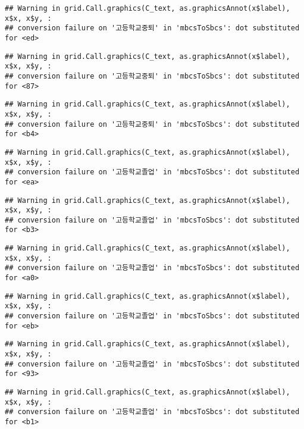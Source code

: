 \documentclass[
]{article}
\begin{document}
\begin{verbatim}
## Warning in grid.Call.graphics(C_text, as.graphicsAnnot(x$label), x$x, x$y, :
## conversion failure on '고등학교중퇴' in 'mbcsToSbcs': dot substituted for <ed>
\end{verbatim}

\begin{verbatim}
## Warning in grid.Call.graphics(C_text, as.graphicsAnnot(x$label), x$x, x$y, :
## conversion failure on '고등학교중퇴' in 'mbcsToSbcs': dot substituted for <87>
\end{verbatim}

\begin{verbatim}
## Warning in grid.Call.graphics(C_text, as.graphicsAnnot(x$label), x$x, x$y, :
## conversion failure on '고등학교중퇴' in 'mbcsToSbcs': dot substituted for <b4>
\end{verbatim}

\begin{verbatim}
## Warning in grid.Call.graphics(C_text, as.graphicsAnnot(x$label), x$x, x$y, :
## conversion failure on '고등학교졸업' in 'mbcsToSbcs': dot substituted for <ea>
\end{verbatim}

\begin{verbatim}
## Warning in grid.Call.graphics(C_text, as.graphicsAnnot(x$label), x$x, x$y, :
## conversion failure on '고등학교졸업' in 'mbcsToSbcs': dot substituted for <b3>
\end{verbatim}

\begin{verbatim}
## Warning in grid.Call.graphics(C_text, as.graphicsAnnot(x$label), x$x, x$y, :
## conversion failure on '고등학교졸업' in 'mbcsToSbcs': dot substituted for <a0>
\end{verbatim}

\begin{verbatim}
## Warning in grid.Call.graphics(C_text, as.graphicsAnnot(x$label), x$x, x$y, :
## conversion failure on '고등학교졸업' in 'mbcsToSbcs': dot substituted for <eb>
\end{verbatim}

\begin{verbatim}
## Warning in grid.Call.graphics(C_text, as.graphicsAnnot(x$label), x$x, x$y, :
## conversion failure on '고등학교졸업' in 'mbcsToSbcs': dot substituted for <93>
\end{verbatim}

\begin{verbatim}
## Warning in grid.Call.graphics(C_text, as.graphicsAnnot(x$label), x$x, x$y, :
## conversion failure on '고등학교졸업' in 'mbcsToSbcs': dot substituted for <b1>
\end{verbatim}
\end{document}
